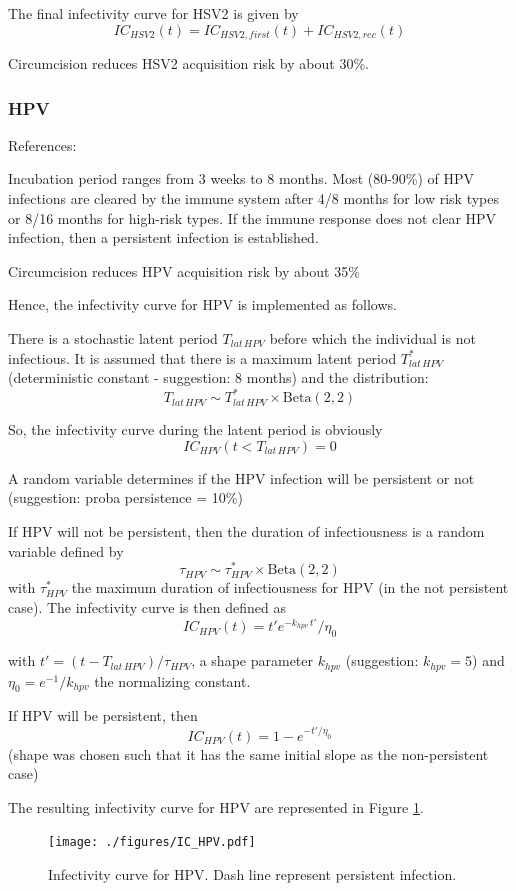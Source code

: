 \documentclass[11pt, onecolumn]{article}
\begin{document}
The final infectivity curve for HSV2 is given by
$$IC_{HSV2}(t) = IC_{HSV2,first}(t) + IC_{HSV2,rec}(t)   $$

Circumcision reduces HSV2 acquisition risk by about 30\%\cite{Tobian:2009kp}.


\subsubsection{HPV}

References: \cite{Stanley:2011dd} \cite{Baussano:2013dh}


Incubation period ranges from 3 weeks to 8 months. Most (80-90\%) of HPV infections are cleared by the immune system after 4/8 months for low risk types or 8/16 months for high-risk types. If the immune response does not clear HPV infection, then a persistent infection is established.

Circumcision reduces HPV acquisition risk by about 35\% \cite{Tobian:2009kp}

Hence, the infectivity curve for HPV is implemented as follows. 

There is a stochastic latent period $T_{lat\,HPV}$ before which the individual is not infectious. It is assumed that there is a maximum latent period $T_{lat\,HPV}^*$ (deterministic constant - suggestion: 8 months) and the distribution:
$$T_{lat\,HPV} \sim T_{lat\,HPV}^* \times \mathrm{Beta}(2,2) $$

So, the infectivity curve during the latent period is obviously
$$IC_{HPV}(t< T_{lat\,HPV}) = 0$$

A random variable determines if the HPV infection will be persistent or not (suggestion: proba persistence = 10\%)

If HPV will not be persistent, then the duration of infectiousness is a random variable defined by
$$\tau_{HPV} \sim \tau_{HPV}^*  \times   \mathrm{Beta}(2,2)$$
with $\tau_{HPV}^* $ the maximum duration of infectiousness for HPV (in the not persistent case). The infectivity curve is then defined as
$$IC_{HPV}(t) = t' e^{-k_{hpv}\, t' }/ \eta_0$$

with $t' = (t-T_{lat\,HPV})/\tau_{HPV} $, a shape parameter $k_{hpv}$ (suggestion: $k_{hpv}=5$) and $\eta_0=e^{-1}/k_{hpv}$ the normalizing constant.

If HPV will be persistent, then 
$$IC_{HPV}(t) = 1- e^{-t'/\eta_0 }$$
(shape was chosen such that it has the same initial slope as the non-persistent case)

The resulting infectivity curve for HPV are represented in Figure \ref{fig:ICHPV}.
\begin{figure}[!ht]
\centering
    \texttt{[image: ./figures/IC\_HPV.pdf]}
\caption{Infectivity curve for HPV. Dash line represent persistent infection.}
\label{fig:ICHPV}
\end{figure}
\end{document}

